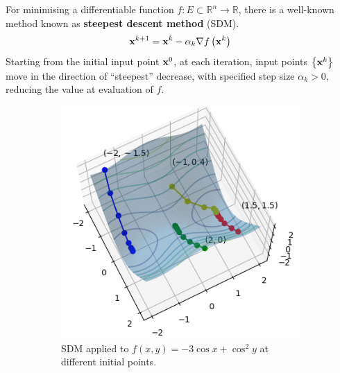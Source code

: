 \documentclass[../dissertation.tex]{subfiles}
\begin{document}
For minimising a differentiable function $f:E \subset \mathbb{R}^n \rightarrow \mathbb{R}$, there is a well-known method known as \textbf{steepest descent method} (SDM)\cite{doi:10.1137/1.9781611974997.ch8}.
\begin{equation}
    \mathbf{x}^{k+1} = \mathbf{x}^{k} - \alpha_k \nabla f \left( \mathbf{x}^{k} \right)
    \label{equ: SDM}
\end{equation}
Starting from the initial input point $\mathbf{x}^{0}$, at each iteration, input points $\left\{ \mathbf{x}^{k} \right\}$ move in the direction of ``steepest'' decrease,
with specified step size $\alpha_k > 0$,
reducing the value at evaluation of $f$.
\begin{figure}[tbp]
    \centering
    \begin{subfigure}[b]{0.4\textwidth}
        \centering
        \includegraphics[width=\textwidth]{sections/gradientFlowImgs/sdm}
        \caption{SDM applied to $f(x,y) = -3 \cos x + \cos^2 y$ at different initial points.}
        \label{fig: SDM}
    \end{subfigure}
    \hspace{1cm}
    \begin{subfigure}[b]{0.4\textwidth}
        \centering

\end{subfigure}
\end{figure}
\end{document}
